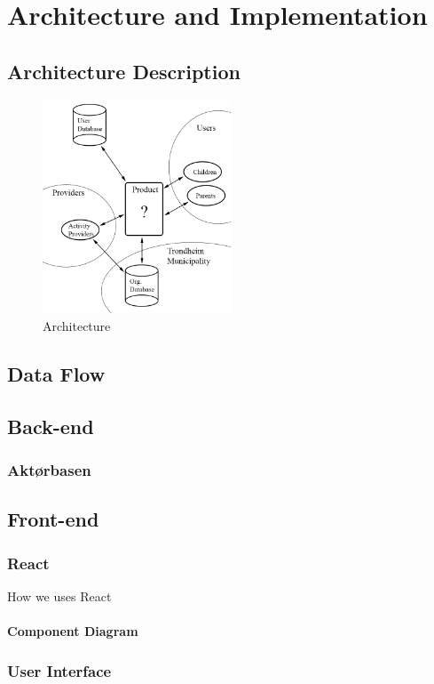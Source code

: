 
\chapter{Architecture and Implementation}

\section{Architecture Description}
 
 \begin{figure}[h!]
    \centering
        \includegraphics[width=0.5\textwidth]{fig/arkitektur}
    \caption{Architecture}
 \end{figure}
    
\section{Data Flow}

\section{Back-end}

\subsection{Aktørbasen}


\section{Front-end}
\subsection{React}
How we uses React
\subsubsection{Component Diagram}

\subsection{User Interface}

\cleardoublepage